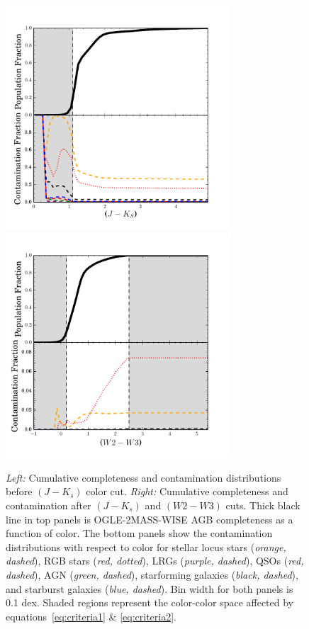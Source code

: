 \begin{figure}[h]
\includegraphics[width=3.3in]{figs/completeness_contamination_jkcut.pdf}\includegraphics[width=3.3in]{figs/completeness_contamination_allcuts.pdf}
\caption{\emph{Left:} Cumulative completeness and contamination distributions before $(J-K_s)$ color cut. \emph{Right:} Cumulative completeness and contamination after $(J-K_s)$ and $(W2-W3)$ cuts. Thick black line in top panels is OGLE-2MASS-WISE AGB completeness as a function of color. The bottom panels show the contamination distributions with respect to color for stellar locus stars (\emph{orange, dashed}), RGB stars (\emph{red, dotted}), LRGs (\emph{purple, dashed}), QSOs (\emph{red, dashed}), AGN (\emph{green, dashed}), starforming galaxies (\emph{black, dashed}), and starburst galaxies (\emph{blue, dashed}). Bin width for both panels is 0.1 dex.  Shaded regions represent the color-color space affected by equations~\ref{eq:criteria1} \& \ref{eq:criteria2}. \label{fig:colorcuts}}
\end{figure}

